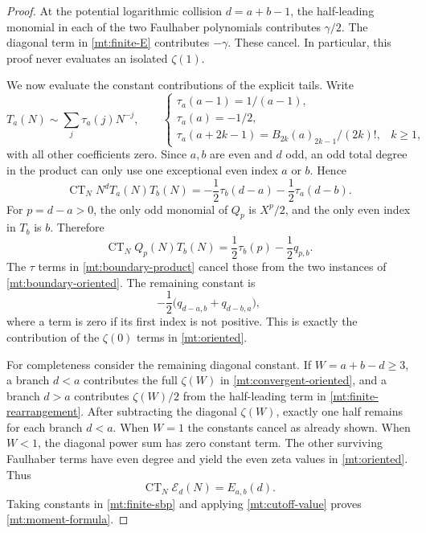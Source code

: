 \begin{proof}
At the potential logarithmic collision $d=a+b-1$, the half-leading
monomial in each of the two Faulhaber polynomials contributes
$\gamma/2$. The diagonal term in \eqref{mt:finite-E} contributes
$-\gamma$. These cancel. In particular, this proof never evaluates
an isolated $\zeta(1)$.

We now evaluate the constant contributions of the explicit tails. Write
\begin{equation}\label{mt:tau}
 T_a(N)\sim\sum_j\tau_a(j)N^{-j},\qquad
 \begin{cases}
 \tau_a(a-1)=1/(a-1),\\
 \tau_a(a)=-1/2,\\
 \tau_a(a+2k-1)=B_{2k}(a)_{2k-1}/(2k)!,&k\ge1,
 \end{cases}
\end{equation}
with all other coefficients zero. Since $a,b$ are even and $d$ odd,
an odd total degree in the product can only use one exceptional even
index $a$ or $b$. Hence
\begin{equation}\label{mt:boundary-product}
 \operatorname{CT}_N N^dT_a(N)T_b(N)
 =-\frac12\tau_b(d-a)-\frac12\tau_a(d-b).
\end{equation}
For $p=d-a>0$, the only odd monomial of $Q_p$ is $X^p/2$,
and the only even index in $T_b$ is $b$. Therefore
\begin{equation}\label{mt:boundary-oriented}
 \operatorname{CT}_N Q_p(N)T_b(N)
 =\frac12\tau_b(p)-\frac12q_{p,b}.
\end{equation}
The $\tau$ terms in \eqref{mt:boundary-product} cancel those from
the two instances of \eqref{mt:boundary-oriented}. The remaining
constant is
\begin{equation}\label{mt:boundary-constant}
 -\frac12\bigl(q_{d-a,b}+q_{d-b,a}\bigr),
\end{equation}
where a term is zero if its first index is not positive. This is
exactly the contribution of the $\zeta(0)$ terms in
\eqref{mt:oriented}.

For completeness consider the remaining diagonal constant. If
$W=a+b-d\ge3$, a branch $d<a$ contributes the full $\zeta(W)$
in \eqref{mt:convergent-oriented}, and a branch $d>a$ contributes
$\zeta(W)/2$ from the half-leading term in
\eqref{mt:finite-rearrangement}. After subtracting the diagonal
$\zeta(W)$, exactly one half remains for each branch $d<a$.
When $W=1$ the constants cancel as already shown. When $W<1$,
the diagonal power sum has zero constant term. The other surviving
Faulhaber terms have even degree and yield the even zeta values in
\eqref{mt:oriented}. Thus
\[
 \operatorname{CT}_N\mathcal E_d(N)=E_{a,b}(d).
\]
Taking constants in \eqref{mt:finite-sbp} and applying
\eqref{mt:cutoff-value} proves \eqref{mt:moment-formula}.
\end{proof}

